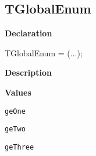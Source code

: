 \documentclass{report}
\newif\ifpdf
\begin{document}
\subsection*{TGlobalEnum}
\fi
\label{ok_enum_nested-TGlobalEnum}
\begin{list}{}{
\setlength{\itemindent}{0cm}
\setlength{\listparindent}{0cm}
\setlength{\leftmargin}{\evensidemargin}
\addtolength{\leftmargin}{\tmplength}
\settowidth{\labelsep}{X}
\addtolength{\leftmargin}{\labelsep}
\setlength{\labelwidth}{\tmplength}
}
\item[\textbf{Declaration}\hfill]
\ifpdf
\begin{flushleft}
\fi
\begin{ttfamily}
TGlobalEnum = (...);\end{ttfamily}

\ifpdf
\end{flushleft}
\fi

\par
\item[\textbf{Description}]
 \item[\textbf{Values}]
\begin{description}
\item[\texttt{geOne}] \label{ok_enum_nested-geOne}
\index{}
 
\item[\texttt{geTwo}] \label{ok_enum_nested-geTwo}
\index{}
 
\item[\texttt{geThree}] \label{ok_enum_nested-geThree}
\index{}
 
\end{description}


\end{list}
\end{document}

